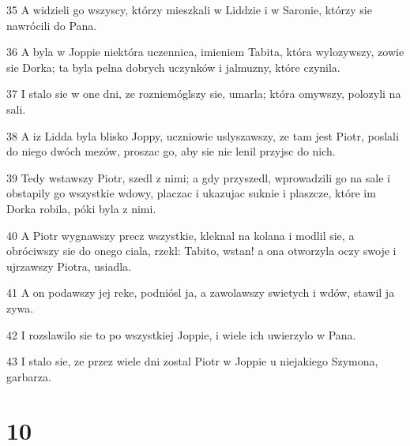 \par 35 A widzieli go wszyscy, którzy mieszkali w Liddzie i w Saronie, którzy sie nawrócili do Pana.
\par 36 A byla w Joppie niektóra uczennica, imieniem Tabita, która wylozywszy, zowie sie Dorka; ta byla pelna dobrych uczynków i jalmuzny, które czynila.
\par 37 I stalo sie w one dni, ze rozniemóglszy sie, umarla; która omywszy, polozyli na sali.
\par 38 A iz Lidda byla blisko Joppy, uczniowie uslyszawszy, ze tam jest Piotr, poslali do niego dwóch mezów, proszac go, aby sie nie lenil przyjsc do nich.
\par 39 Tedy wstawszy Piotr, szedl z nimi; a gdy przyszedl, wprowadzili go na sale i obstapily go wszystkie wdowy, placzac i ukazujac suknie i plaszcze, które im Dorka robila, póki byla z nimi.
\par 40 A Piotr wygnawszy precz wszystkie, kleknal na kolana i modlil sie, a obróciwszy sie do onego ciala, rzekl: Tabito, wstan! a ona otworzyla oczy swoje i ujrzawszy Piotra, usiadla.
\par 41 A on podawszy jej reke, podniósl ja, a zawolawszy swietych i wdów, stawil ja zywa.
\par 42 I rozslawilo sie to po wszystkiej Joppie, i wiele ich uwierzylo w Pana.
\par 43 I stalo sie, ze przez wiele dni zostal Piotr w Joppie u niejakiego Szymona, garbarza.

\chapter{10}

